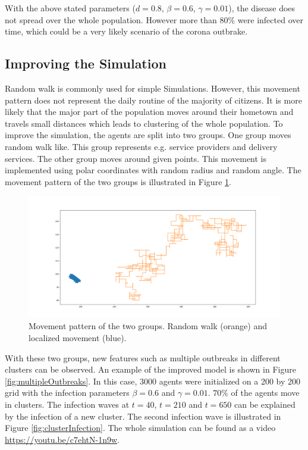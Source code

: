 With the above stated parameters ($d=0.8$, $\beta=0.6$, $\gamma=0.01$), the disease does not spread over the whole population. However more than 80\% were infected over time, which could be a very likely scenario of the corona outbrake.


\subsection{Improving the Simulation}
Random walk is commonly used for simple Simulations. However, this movement pattern does not represent the daily routine of the majority of citizens. It  is more likely that the major part of the population moves around their hometown and travels small distances which leads to clustering of the whole population. To improve the simulation, the agents are split into two groups. One group moves random walk like. This group represents e.g. service providers and delivery services. The other group moves around given points. This movement is implemented using polar coordinates with random radius and random angle. The movement pattern of the two groups is illustrated in Figure \ref{fig:movementPattern}. 
\begin{figure}[H]
	\centering
	\includegraphics[width=0.9\linewidth]{img/movementPattern.png}
	\caption{Movement pattern of the two groups. Random walk (orange) and localized movement (blue).}%
	\label{fig:movementPattern}
\end{figure}

With these two groups, new features such as multiple outbreaks in different clusters can be observed. An example of the improved model is shown in Figure \ref{fig:multipleOutbreaks}. In this case, 3000 agents were initialized on a 200 by 200 grid with the infection parameters $\beta=0.6$ and $\gamma = 0.01$. $70\%$ of the agents move in clusters. The infection waves at $t = 40$, $t = 210$ and $t= 650$ can be explained by the infection of a new cluster. The second infection wave is illustrated in Figure \ref{fig:clusterInfection}. The whole simulation can be found  as a video \url{https://youtu.be/c7ehtN-1n9w}.

